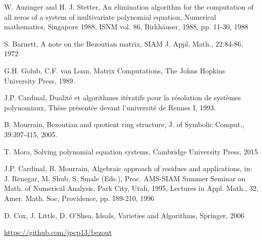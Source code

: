 \documentclass{standalone}
\begin{document}
  \begin{thebibliography}{00}

  {W. Auzinger and H. J. Stetter},
  {An elimination algorithm for the computation of all zeros of a system of multivariate polynomial equation},
  {Numerical mathematics, Singapore 1988, ISNM vol. 86, Birkhäuser, 1988, pp. 11-30}, {1988}

  {S. Barnett}, {A note on the Bezoutian matrix},
  {SIAM J. Appl. Math., 22:84-86}, {1972}

  {G.H. Golub, C.F. van Loan},
  {Matrix Computations}, {The Johns Hopkins University Press}, {1989}.

  {J.P. Cardinal}, {Dualité et algorithmes itératifs pour la résolution de systèmes polynomiaux}, {Thèse présentée devant l'université de Rennes I}, {1993}.

  {B. Mourrain}, {Bezoutian and quotient ring structure},
  {J. of Symbolic Comput., 39:397-415}, {2005}.

  {T. Mora}, {Solving polynomial equation systems}, {Cambridge University Press}, {2015}

  {J.P. Cardinal, B. Mourrain}, {Algebraic approach of residues and applications}, {in: J. Renegar, M. Shub, S. Smale (Eds.), Proc. AMS-SIAM Summer Seminar on Math. of Numerical Analysis, Park City, Utah, 1995, Lectures in Appl. Math., 32, Amer. Math. Soc, Providence, pp. 189-210}, {1996}

  {D. Cox, J. Little, D. O'Shea},
  {Ideals, Varieties and Algorithms}, {Springer},
  2006

  \url{https://github.com/jpcp13/bezout}

  \end{thebibliography}
\end{document}
